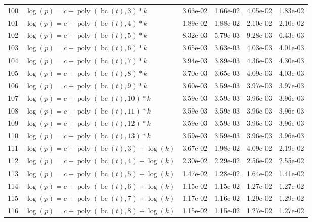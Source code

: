 \documentclass[12pt,a4paper]{article}
\DeclareMathOperator{\bc}{bc}
\DeclareMathOperator{\poly}{poly}
\begin{document}
\begin{longtable}[t]{ll>{\raggedleft\arraybackslash}p{2cm}>{\raggedleft\arraybackslash}p{2cm}>{\raggedleft\arraybackslash}p{2cm}>{\raggedleft\arraybackslash}p{2cm}}
100 & $\log(p) = c + \poly\left( \bc(t), 3 \right) * k$ & 3.63e-02 & 1.66e-02 & 4.05e-02 & 1.83e-02\\
\rowcolor{gray!6}  101 & $\log(p) = c + \poly\left( \bc(t), 4 \right) * k$ & 1.89e-02 & 1.88e-02 & 2.10e-02 & 2.10e-02\\
102 & $\log(p) = c + \poly\left( \bc(t), 5 \right) * k$ & 8.32e-03 & 5.79e-03 & 9.28e-03 & 6.43e-03\\
\rowcolor{gray!6}  103 & $\log(p) = c + \poly\left( \bc(t), 6 \right) * k$ & 3.65e-03 & 3.63e-03 & 4.03e-03 & 4.01e-03\\
104 & $\log(p) = c + \poly\left( \bc(t), 7 \right) * k$ & 3.94e-03 & 3.89e-03 & 4.36e-03 & 4.30e-03\\
\rowcolor{gray!6}  105 & $\log(p) = c + \poly\left( \bc(t), 8 \right) * k$ & 3.70e-03 & 3.65e-03 & 4.09e-03 & 4.03e-03\\
106 & $\log(p) = c + \poly\left( \bc(t), 9 \right) * k$ & 3.60e-03 & 3.59e-03 & 3.97e-03 & 3.97e-03\\
\rowcolor{gray!6}  107 & $\log(p) = c + \poly\left( \bc(t), 10 \right) * k$ & 3.59e-03 & 3.59e-03 & 3.96e-03 & 3.96e-03\\
108 & $\log(p) = c + \poly\left( \bc(t), 11 \right) * k$ & 3.59e-03 & 3.59e-03 & 3.96e-03 & 3.96e-03\\
\rowcolor{gray!6}  109 & $\log(p) = c + \poly\left( \bc(t), 12 \right) * k$ & 3.59e-03 & 3.59e-03 & 3.96e-03 & 3.96e-03\\
110 & $\log(p) = c + \poly\left( \bc(t), 13 \right) * k$ & 3.59e-03 & 3.59e-03 & 3.96e-03 & 3.96e-03\\
\rowcolor{gray!6}  111 & $\log(p) = c + \poly\left( \bc(t), 3 \right) + \log(k)$ & 3.67e-02 & 1.98e-02 & 4.09e-02 & 2.19e-02\\
112 & $\log(p) = c + \poly\left( \bc(t), 4 \right) + \log(k)$ & 2.30e-02 & 2.29e-02 & 2.56e-02 & 2.55e-02\\
\rowcolor{gray!6}  113 & $\log(p) = c + \poly\left( \bc(t), 5 \right) + \log(k)$ & 1.47e-02 & 1.28e-02 & 1.64e-02 & 1.41e-02\\
114 & $\log(p) = c + \poly\left( \bc(t), 6 \right) + \log(k)$ & 1.15e-02 & 1.15e-02 & 1.27e-02 & 1.27e-02\\
\rowcolor{gray!6}  115 & $\log(p) = c + \poly\left( \bc(t), 7 \right) + \log(k)$ & 1.17e-02 & 1.16e-02 & 1.29e-02 & 1.29e-02\\
116 & $\log(p) = c + \poly\left( \bc(t), 8 \right) + \log(k)$ & 1.15e-02 & 1.15e-02 & 1.27e-02 & 1.27e-02\\

\end{longtable}
\end{document}
